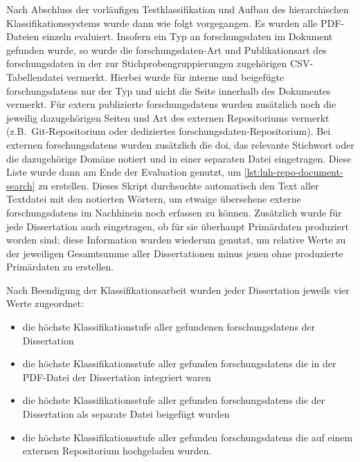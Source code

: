 Nach Abschluss der vorläufigen Testklassifikation und Aufbau des hierarchischen Klassifikationssystems wurde dann wie folgt vorgegangen.
Es wurden alle PDF-Dateien einzeln evaluiert.
Insofern ein Typ an \gls{forschungsdaten} im Dokument gefunden wurde, so wurde die \gls{forschungsdaten}-Art und Publikationsart des \gls{forschungsdaten} in der zur Stichprobengruppierungen zugehörigen CSV-Tabellendatei vermerkt.
Hierbei wurde für interne und beigefügte \glspl{forschungsdaten} nur der Typ und nicht die Seite innerhalb des Dokumentes vermerkt.
Für extern publizierte \glspl{forschungsdaten} wurden zusätzlich noch die jeweilig dazugehörigen Seiten und Art des externen Repositoriums vermerkt (z.B.~Git-Repositorium oder dediziertes \gls{forschungsdaten}-Repositorium).
Bei externen \glspl{forschungsdaten} wurden zusätzlich die \gls{doi}, das relevante Stichwort oder die dazugehörige Domäne notiert und in einer separaten Datei eingetragen.
Diese Liste wurde dann am Ende der Evaluation genutzt, um \cref{lst:luh-repo-document-search} zu erstellen.
Dieses Skript durchsuchte automatisch den Text aller Textdatei mit den notierten Wörtern, um etwaige übersehene externe \glspl{forschungsdaten} im Nachhinein noch erfassen zu können.
Zusätzlich wurde für jede Dissertation auch eingetragen, ob für sie überhaupt Primärdaten produziert worden sind; diese Information wurden wiederum genutzt, um relative Werte zu der jeweiligen Gesamtsumme aller Dissertationen minus jenen ohne produzierte Primärdaten zu erstellen.

Nach Beendigung der Klassifikationsarbeit wurden jeder Dissertation jeweils vier Werte zugeordnet: 
\begin{itemize}
    \item die höchste Klassifikationstufe aller gefundenen \glspl{forschungsdaten} der Dissertation
    \item die höchste Klassifikationsstufe aller gefunden \glspl{forschungsdaten} die in der PDF-Datei der Dissertation integriert waren
    \item die höchste Klassifikationsstufe aller gefunden \glspl{forschungsdaten} die der Dissertation als separate Datei beigefügt wurden
    \item die höchste Klassifikationsstufe aller gefunden \glspl{forschungsdaten} die auf einem externen Repositorium hochgeladen wurden.
\end{itemize}

